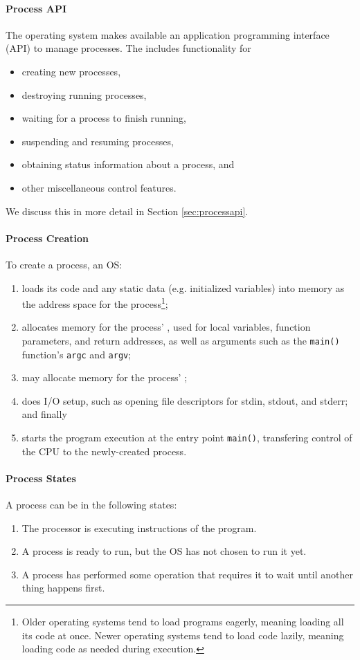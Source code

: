 \paragraph{Process API}
The operating system makes available an application programming interface (API) to manage processes. The  includes functionality for
\begin{itemize}[noitemsep]
    \item creating new processes,
    \item destroying running processes,
    \item waiting for a process to finish running,
    \item suspending and resuming processes,
    \item obtaining status information about a process, and
    \item other miscellaneous control features.
\end{itemize}

We discuss this in more detail in Section \ref{sec:processapi}.

\paragraph{Process Creation}
To create a process, an OS:
\begin{enumerate}
    \item loads its code and any static data (e.g. initialized variables) into memory as the address space for the process\footnote{Older operating systems tend to load programs eagerly, meaning loading all its code at once. Newer operating systems tend to load code lazily, meaning loading code as needed during execution.};
    \item allocates memory for the process' , used for local variables, function parameters, and return addresses, as well as arguments such as the \texttt{main()} function's \texttt{argc} and \texttt{argv};
    \item may allocate memory for the process' ;
    \item does I/O setup, such as opening file descriptors for stdin, stdout, and stderr; and finally
    \item starts the program execution at the entry point \texttt{main()}, transfering control of the CPU to the newly-created process.
\end{enumerate}

\paragraph{Process States}
A process can be in the following states:
\begin{enumerate}
    \item {} The processor is executing instructions of the program.
    \item {} A process is ready to run, but the OS has not chosen to run it yet.
    \item {} A process has performed some operation that requires it to wait until another thing happens first.
\end{enumerate}

